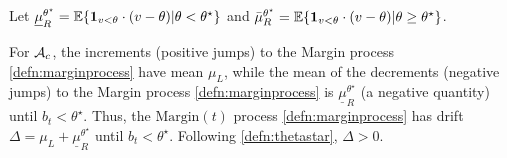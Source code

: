 Let ${\underline \mu}_R^{\theta^\star} = 
\bbE\{\b1_{v< \theta}\cdot (v-\theta) | \theta<\theta^\star\}$ and $\bar {\mu}_R^{\theta^\star} = 
\bbE\{\b1_{v< \theta}\cdot (v-\theta) | \theta \ge \theta^\star\}$.  
  \begin{definition}\label{defn:mindrift}
For $\mathcal{A}_c$, the increments (positive jumps) to the Margin process \eqref{defn:marginprocess} have mean $\mu_L$, while the mean of the decrements (negative jumps) to the Margin process \eqref{defn:marginprocess} is  $\underline {\mu}_R^{\theta^\star}$ (a negative quantity) until $b_t<\theta^\star$. Thus, the $\text{Margin}(t)$ process \eqref{defn:marginprocess} has  drift $\Delta = \mu_L +\underline {\mu}_R^{\theta^\star}$ until $b_t<\theta^\star$.
Following \eqref{defn:thetastar}, $\Delta>0$. 
\end{definition}
